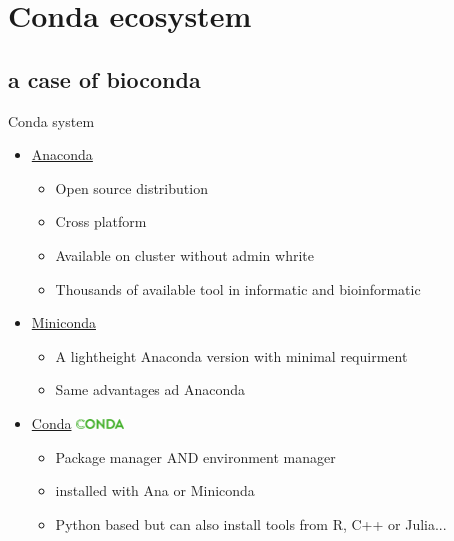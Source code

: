 \section{Conda ecosystem}
\subsection{a case of bioconda}

\begin{frame}{Conda system}
\begin{itemize}
\item<2-4> \hyperlink{https://www.anaconda.com/}{Anaconda}
	\begin{itemize}
	\item Open source distribution
    \item Cross platform
    \item Available on cluster without admin whrite
    \item Thousands of available tool in informatic and bioinformatic
	\end{itemize}
\item<3-4> \hyperlink{https://docs.conda.io/en/latest/miniconda.html}{Miniconda}
	\begin{itemize}
	\item A lightheight Anaconda version with minimal requirment
	\item Same advantages ad Anaconda
	\end{itemize}
\item<4-4> \hyperlink{https://docs.conda.io/projects/conda/en/latest/index.html}{Conda} \includegraphics[width=0.1\textwidth]{images/conda_logo.pdf} 
	\begin{itemize}[<4->]
	\item Package manager AND environment manager
	\item installed with Ana or Miniconda
	\item Python based but can also install tools from R, C++ or Julia...
	\end{itemize}
\end{itemize}
\end{frame}

